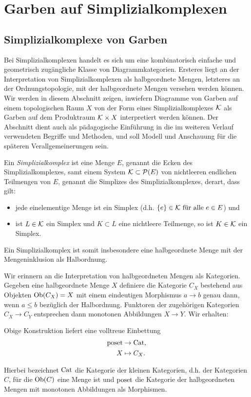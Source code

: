 
\chapter{Garben auf Simplizialkomplexen}
\label{ch:simp-comp}

\section{Simplizialkomplexe von Garben}
\label{sec:simp-comp-ord}

Bei Simplizialkomplexen handelt es sich um eine kombinatorisch
einfache und geometrisch zugängliche Klasse von
Diagrammkategorien. Ersteres liegt an der Interpretation von
Simplizialkomplexen als halbgeordnete Mengen, letzteres an der
Ordnungstopologie, mit der halbgeordnete Mengen versehen werden
können. Wir werden in diesem Abschnitt zeigen, inwiefern Diagramme von
Garben auf einem topologischen Raum $X$ von der Form eines
Simplizialkomplexes $\mathcal{K}$ als Garben auf dem Produktraum $\mathcal{K} \times X$
interpretiert werden können. Der Abschnitt dient auch als pädagogische
Einführung in die im weiteren Verlauf verwendeten Begriffe und
Methoden, und soll Modell und Anschauung für die späteren
Verallgemeinerungen sein.
\begin{defn}
  Ein \emph{Simplizialkomplex} ist eine Menge $E$, genannt die Ecken
  des Simplizialkomplexes, samt einem System $ \mathcal{K} \subset
  \mathcal{P}(E) $ von nichtleeren endlichen Teilmengen von $E$,
  genannt die Simplizes des Simplizialkomplexes, derart, dass gilt:
  \begin{itemize}
  \item jede einelementige Menge ist ein Simplex (d.h. $\{e\} \in
    \mathcal{K} \text{ für alle } e \in E$) und
  \item ist $L \in \mathcal{K}$ ein Simplex und $K \subset L$ eine
    nichtleere Teilmenge, so ist $K \in \mathcal{K}$ ein Simplex.
  \end{itemize}
\end{defn}
Ein Simplizialkomplex ist somit insbesondere eine halbgeordnete Menge
mit der Mengeninklusion als Halbordnung.

Wir erinnern an die Interpretation von halbgeordneten Mengen als
Kategorien. Gegeben eine halbgeordnete Menge $X$ definiere die
Kategorie $C_X$ bestehend aus Objekten $\operatorname{Ob}(C_X) = X$ mit einem
eindeutigen Morphismus $a \to b$ genau dann, wenn $a \leq b$ bezüglich
der Halbordnung. Funktoren der zugehörigen Kategorien $C_X \to C_Y$
entsprechen dann monotonen Abbildungen $X \to Y$. Wir erhalten:
\begin{lemma} \label{poset-cat}
  Obige Konstruktion liefert eine volltreue Einbettung
  \begin{align*}
    \operatorname{poset} &\to \operatorname{Cat}, \\
    X &\mapsto C_X.    
  \end{align*}
\end{lemma}
Hierbei bezeichnet $\operatorname{Cat}$ die Kategorie der kleinen Kategorien,
d.h. der Kategorien $C$, für die $\operatorname{Ob}(C)$ eine Menge ist und $\operatorname{poset}$
die Kategorie der halbgeordneten Mengen mit monotonen Abbildungen als
Morphismen.

